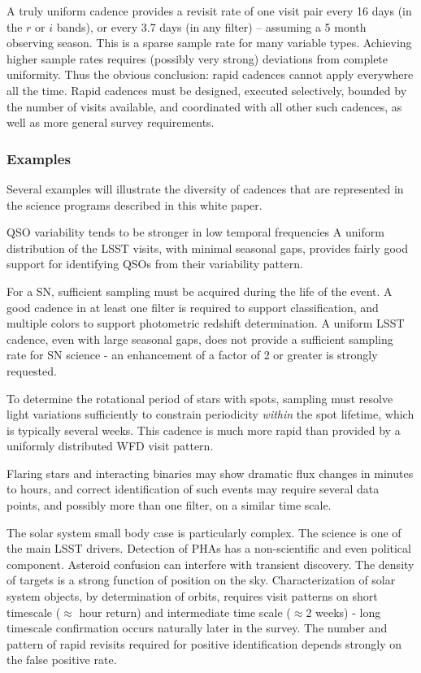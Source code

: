 A truly uniform cadence provides a revisit rate of one visit pair every
16 days (in the $r$ or $i$ bands), or every 3.7 days (in any filter) --
assuming a 5 month observing season.  This is a sparse sample rate for
many variable types.  Achieving higher sample rates requires (possibly
very strong) deviations from complete uniformity.  Thus the obvious
conclusion: rapid cadences cannot apply everywhere all the time. Rapid
cadences must be designed, executed selectively, bounded by the number
of visits available, and coordinated with all other such cadences, as
well as more general survey requirements.

\subsubsection{Examples}

Several examples will illustrate the diversity of cadences that are
represented in the science programs described in this white paper.

QSO variability tends to be stronger in low temporal frequencies   A uniform distribution of the
LSST visits, with minimal seasonal gaps, provides fairly good support
for identifying QSOs from their variability pattern.

For a SN, sufficient sampling must be acquired during the life of the
event. A good cadence in at least one filter is required to support
classification, and multiple colors to support photometric redshift
determination.  A uniform LSST cadence, even with large seasonal gaps,
does not provide a sufficient sampling rate for SN science - an
enhancement of a factor of 2 or greater is strongly requested.

To determine the rotational period of stars with spots, sampling must
resolve light variations sufficiently to constrain periodicity {\it
within} the spot lifetime, which is typically several weeks. This
cadence is much more rapid than provided by a uniformly distributed WFD
visit pattern.

Flaring stars and interacting binaries may show dramatic flux changes
in minutes to hours, and correct identification of such events may
require several data points, and possibly more than one filter, on a
similar time scale.

The solar system small body case is particularly complex.  The science
is one of the main LSST drivers.  Detection of PHAs has a non-scientific
and even political component. Asteroid confusion can interfere with
transient discovery. The density of targets is a strong function of
position on the sky.  Characterization of solar system objects, by
determination of orbits, requires visit patterns on short timescale
($\approx$ hour return) and intermediate time scale ($\approx$2 weeks) -
long timescale confirmation occurs naturally later in the survey.  The
number and pattern of rapid revisits required for positive
identification depends strongly on the false positive rate.


